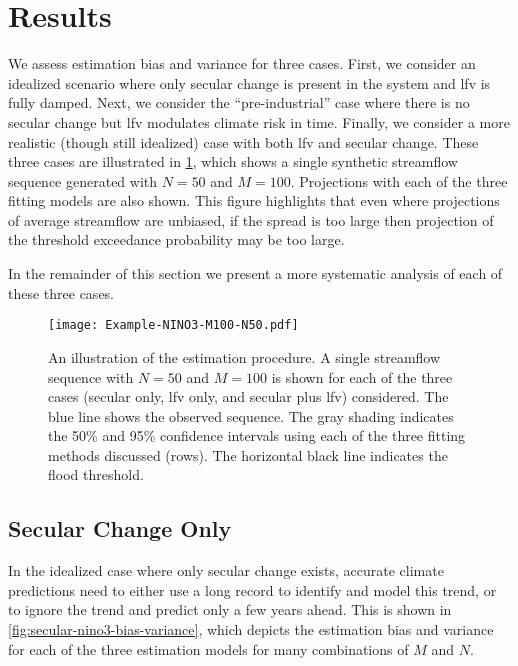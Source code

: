 \documentclass[
  draft,
  linenumbers
]{agujournal2018}
\begin{document}
\section{Results}\label{sec:results}

We assess estimation bias and variance for three cases.
First, we consider an idealized scenario where only secular change is present in the system and \gls{lfv} is fully damped.
Next, we consider the ``pre-industrial'' case where there is no secular change but \gls{lfv} modulates climate risk in time.
Finally, we consider a more realistic (though still idealized) case with both \gls{lfv} and secular change.
These three cases are illustrated in \cref{fig:example-fit}, which shows a single synthetic streamflow sequence generated with $N=50$ and $M=100$.
Projections with each of the three fitting models are also shown.
This figure highlights that even where projections of average streamflow are unbiased, if the spread is too large then projection of the threshold exceedance probability may be too large.

In the remainder of this section we present a more systematic analysis of each of these three cases.
\begin{figure}
  \texttt{[image: Example-NINO3-M100-N50.pdf]}
  \caption{
    An illustration of the estimation procedure.
    A single streamflow sequence with $N=50$ and $M=100$ is shown for each of the three cases (secular only, \gls{lfv} only, and secular plus \gls{lfv}) considered.
    The blue line shows the observed sequence.
    The gray shading indicates the 50\% and 95\% confidence intervals using each of the three fitting methods discussed (rows).
    The horizontal black line indicates the flood threshold.
  }\label{fig:example-fit}
\end{figure}

\subsection{Secular Change Only}

In the idealized case where only secular change exists, accurate climate predictions need to either use a long record to identify and model this trend, or to ignore the trend and predict only a few years ahead.
This is shown in \cref{fig:secular-nino3-bias-variance}, which depicts the estimation bias and variance for each of the three estimation models for many combinations of $M$ and $N$.
\end{document}
